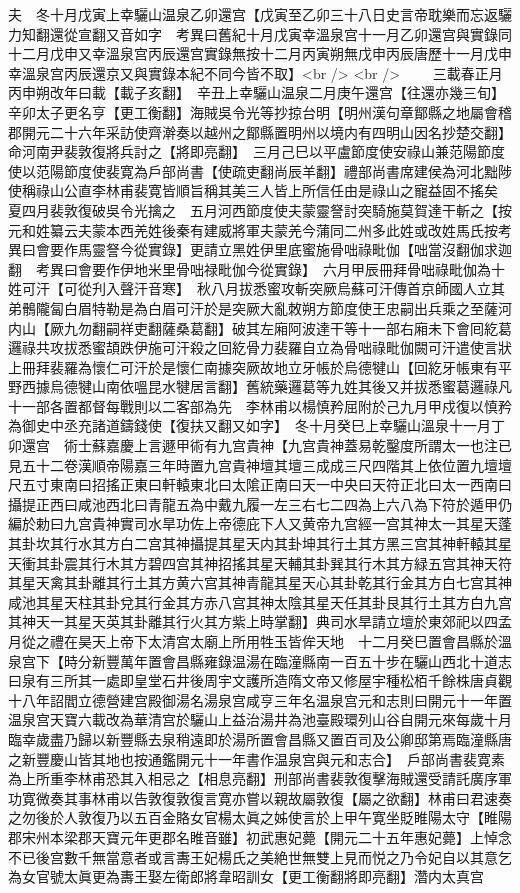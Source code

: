 夫　冬十月戊寅上幸驪山温泉乙卯還宫【戊寅至乙卯三十八日史言帝耽樂而忘返驪力知翻還從宣翻又音如字　考異曰舊紀十月戊寅幸溫泉宫十一月乙卯還宫與實錄同十二月戊申又幸溫泉宫丙辰還宫實錄無按十二月丙寅朔無戊申丙辰唐歷十一月戊申幸溫泉宫丙辰還京又與實錄本紀不同今皆不取】<br />
<br />
　　三載春正月丙申朔改年曰載【載子亥翻】　辛丑上幸驪山温泉二月庚午還宫【往還亦幾三旬】　辛卯太子更名亨【更工衡翻】海賊吳令光等抄掠台明【明州漢句章鄮縣之地屬會稽郡開元二十六年采訪使齊澣奏以越州之鄮縣置明州以境内有四明山因名抄楚交翻】命河南尹裴敦復將兵討之【將即亮翻】　三月己巳以平盧節度使安祿山兼范陽節度使以范陽節度使裴寛為戶部尚書【使疏吏翻尚辰羊翻】禮部尚書席建侯為河北黜陟使稱祿山公直李林甫裴寛皆順旨稱其美三人皆上所信任由是祿山之寵益固不搖矣　夏四月裴敦復破吳令光擒之　五月河西節度使夫蒙靈詧討突騎施莫賀達干斬之【按元和姓纂云夫蒙本西羌姓後秦有建威將軍夫蒙羌今蒲同二州多此姓或改姓馬氏按考異曰會要作馬靈詧今從實錄】更請立黑姓伊里底蜜施骨咄祿毗伽【咄當沒翻伽求迦翻　考異曰會要作伊地米里骨咄禄毗伽今從實錄】　六月甲辰冊拜骨咄祿毗伽為十姓可汗【可從刋入聲汗音寒】　秋八月拔悉蜜攻斬突厥烏蘇可汗傳首京師國人立其弟鶻隴匐白眉特勒是為白眉可汗於是突厥大亂敇朔方節度使王忠嗣出兵乘之至薩河内山【厥九勿翻嗣祥吏翻薩桑葛翻】破其左廂阿波達干等十一部右廂未下會囘紇葛邏祿共攻拔悉蜜頡跌伊施可汗殺之回紇骨力裴羅自立為骨咄祿毗伽闕可汗遣使言狀上冊拜裴羅為懷仁可汗於是懷仁南據突厥故地立牙帳於烏德犍山【回紇牙帳東有平野西據烏德犍山南依嗢昆水犍居言翻】舊統藥邏葛等九姓其後又并拔悉蜜葛邏祿凡十一部各置都督每戰則以二客部為先　李林甫以楊慎矜屈附於己九月甲戍復以慎矜為御史中丞充諸道鑄錢使【復扶又翻又如字】　冬十月癸巳上幸驪山溫泉十一月丁卯還宫　術士蘇嘉慶上言遯甲術有九宫貴神【九宫貴神蓋易乾鑿度所謂太一也注已見五十二卷漢順帝陽嘉三年時置九宫貴神壇其壇三成成三尺四階其上依位置九壇壇尺五寸東南曰招搖正東曰軒轅東北曰太隂正南曰天一中央曰天符正北曰太一西南曰攝提正西曰咸池西北曰青龍五為中戴九履一左三右七二四為上六八為下符於遁甲仍編於勅曰九宫貴神實司水旱功佐上帝德庇下人又黄帝九宫經一宫其神太一其星天蓬其卦坎其行水其方白二宫其神攝提其星天内其卦坤其行土其方黑三宫其神軒轅其星天衝其卦震其行木其方碧四宫其神招搖其星天輔其卦巽其行木其方緑五宫其神天符其星天禽其卦離其行土其方黄六宫其神青龍其星天心其卦乾其行金其方白七宫其神咸池其星天柱其卦兌其行金其方赤八宫其神太陰其星天任其卦艮其行土其方白九宫其神天一其星天英其卦離其行火其方紫上時掌翻】典司水旱請立壇於東郊祀以四孟月從之禮在昊天上帝下太清宫太廟上所用牲玉皆侔天地　十二月癸巳置會昌縣於溫泉宫下【時分新豐萬年置會昌縣雍錄温湯在臨潼縣南一百五十步在驪山西北十道志曰泉有三所其一處即皇堂石井後周宇文護所造隋文帝又修屋宇種松栢千餘株唐貞觀十八年詔閻立德營建宫殿御湯名湯泉宫咸亨三年名温泉宫元和志則曰開元十一年置温泉宫天寶六載改為華清宫於驪山上益治湯井為池臺殿環列山谷自開元來每歲十月臨幸歲盡乃歸以新豐縣去泉稍遠即於湯所置會昌縣又置百司及公卿邸第焉臨潼縣唐之新豐慶山皆其地也按通鑑開元十一年書作温泉宫與元和志合】　戶部尚書裴寛素為上所重李林甫恐其入相忌之【相息亮翻】刑部尚書裴敦復擊海賊還受請託廣序軍功寛微奏其事林甫以告敦復敦復言寛亦嘗以親故屬敦復【屬之欲翻】林甫曰君速奏之勿後於人敦復乃以五百金賂女官楊太眞之姊使言於上甲午寛坐貶睢陽太守【睢陽郡宋州本梁郡天寶元年更郡名睢音雖】初武惠妃薨【開元二十五年惠妃薨】上悼念不已後宫數千無當意者或言夀王妃楊氏之美絶世無雙上見而悦之乃令妃自以其意乞為女官號太眞更為夀王娶左衛郎將韋昭訓女【更工衡翻將即亮翻】濳内太真宫